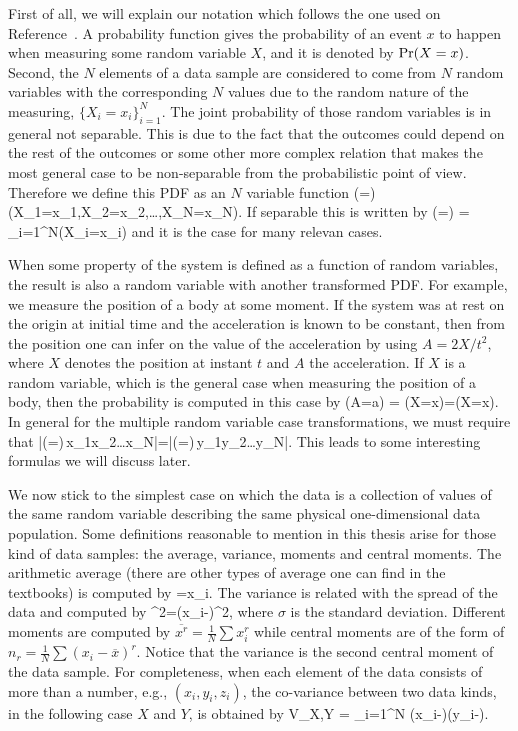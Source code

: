 First of all, we will explain our notation which follows the one used on Reference~\citep{Riley1998}.
A probability function gives the probability of an event $x$ to happen when measuring some random variable $X$, and it is denoted by $\text{Pr}(X=x)$.
Second, the $N$ elements of a data sample are considered to come from $N$ random variables with the corresponding $N$ values due to the random nature of the measuring, $\{X_i=x_i\}_{i=1}^N$.
The joint probability of those random variables is in general not separable.
This is due to the fact that the outcomes could depend on the rest of the outcomes or some other more complex relation that makes the most general case to be non-separable from the probabilistic point of view.
Therefore we define this PDF as an $N$ variable function
\be
  \prob(=) \equiv \prob(X_1=x_1,X_2=x_2,\dots,X_N=x_N).
\ee
If separable this is written by
\be
  \prob(=) = \prod_{i=1}^N\prob(X_i=x_i)
\ee
and it is the case for many relevan cases.

When some property of the system is defined as a function of random variables, the result is also a random variable with another transformed PDF.
For example, we measure the position of a body at some moment.
If the system was at rest on the origin at initial time and the acceleration is known to be constant, then from the position one can infer on the value of the acceleration by using $A=2X/t^2$, where $X$ denotes the position at instant $t$ and $A$ the acceleration.
If $X$ is a random variable, which is the general case when measuring the position of a body, then the probability is computed in this case by
\be
  \prob(A=a) = \prob(X=x)=\prob(X=x).
\ee
In general for the multiple random variable case transformations, we must require that
\be
  |\prob(=)\,x_1x_2\dots{}x_N|=|\prob(=)\,y_1y_2\dots{}y_N|.
\ee
This leads to some interesting formulas we will discuss later.

We now stick to the simplest case on which the data is a collection of values of the same random variable describing the same physical one-dimensional data population.
Some definitions reasonable to mention in this thesis arise for those kind of data samples: the average, variance, moments and central moments.
The arithmetic average (there are other types of average one can find in the textbooks) is computed by
\be
  =\sum x_i.
\ee
The variance is related with the spread of the data and computed by
\be
  \sigma^2=\sum (x_i-)^2,
\ee
where $\sigma$ is the standard deviation.
Different moments are computed by $\overline{x^r}=\frac{1}{N}\sum x_i^r$ while central moments are of the form of $n_r=\frac{1}{N}\sum (x_i-\overline{x})^r$.
Notice that the variance is the second central moment of the data sample.
For completeness, when each element of the data consists of more than a number, e.g., $(x_i,y_i,z_i)$, the co-variance between two data kinds, in the following case $X$ and $Y$, is obtained by
\be
  V_{X,Y} = \sum_{i=1}^N (x_i-)(y_i-).
\ee

